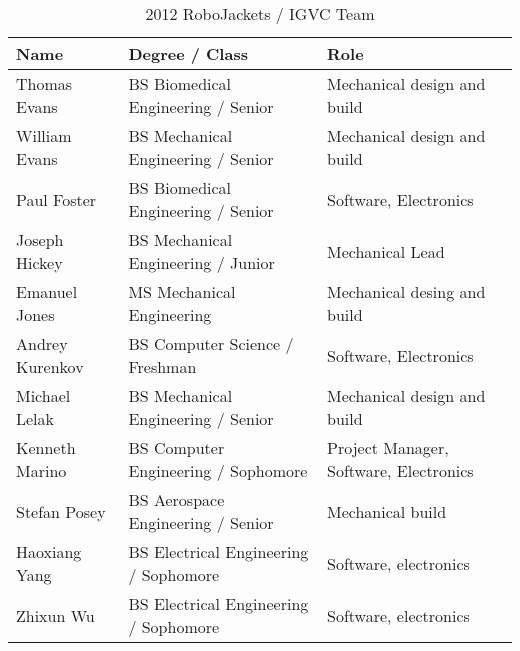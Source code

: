 \begin{table}[H]
\begin{center}
\caption{2012 RoboJackets / IGVC Team}
\begin{tabular}{| l | p{2.4in} | p{2in} |}
\hline
Name & Degree / Class & Role\\ \hline
Thomas Evans &		BS Biomedical Engineering / Senior& Mechanical design and build\\ \hline
William Evans &		BS Mechanical Engineering / Senior& Mechanical design and build\\ \hline
Paul Foster &		BS Biomedical Engineering / Senior& Software, Electronics\\ \hline
Joseph Hickey &		BS Mechanical Engineering / Junior&	Mechanical Lead\\ \hline
Emanuel Jones &		MS Mechanical Engineering& Mechanical desing and build\\ \hline
Andrey Kurenkov &	BS Computer Science / Freshman & Software, Electronics\\ \hline
Michael Lelak &		BS Mechanical Engineering / Senior& Mechanical design and build\\ \hline
Kenneth Marino &	BS Computer Engineering / Sophomore&	Project Manager, Software, Electronics\\ \hline
Stefan Posey &		BS Aerospace Engineering / Senior &		Mechanical build\\ \hline
Haoxiang Yang &		BS Electrical Engineering / Sophomore & Software, electronics\\ \hline
Zhixun Wu &			BS Electrical Engineering / Sophomore &	Software, electronics\\ \hline 



\end{tabular}
\label{TAB:RJTeam}
\end{center}
\end{table}
